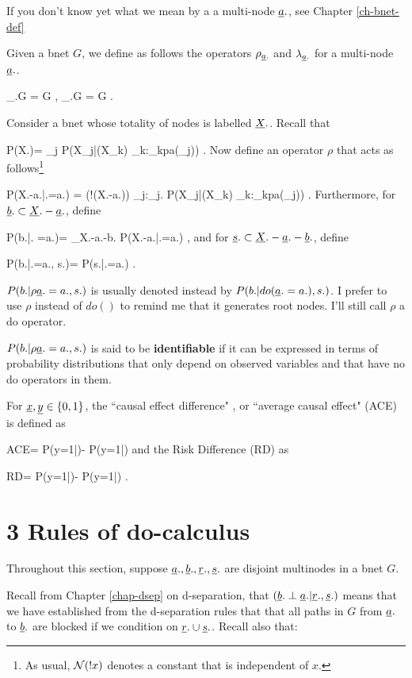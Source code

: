 If
you don't
know yet
what we mean by a
a multi-node
${\underline{a}}.$, see
Chapter \ref{ch-bnet-def}

Given a bnet
$G$,
we define
as follows
the operators
$\rho_{{\underline{a}}.}$
and
$\lambda_{{\underline{a}}.}$
for a multi-node
${\underline{a}}.$.

\beq
\rho_{\rva.}G =
G
\;,\;\;\;\;
\lam_{\rva.}G =
G
\;.
\eeq

Consider a bnet 
whose totality of nodes
is labelled ${\underline{X}}.$.
Recall that 

\beq
P(X.)=
\prod_j P(X_j|(X_k)
_{k:\rvX_k\in pa(\rvX_j)})
\;.
\eeq
Now define an
operator $\rho$
that acts as follows\footnote{As usual,
${\cal N}(!x)$ denotes 
a constant 
that is independent of $x$.}

\beq
P(X.-a.|\rho\rva.=a.)
=
\caln(!(X.-a.))
\prod_{j:\rvX_j\notin \rva.}
P(X_j|(X_k)
_{k:\rvX_k\in pa(\rvX_j)})
\;.
\eeq
Furthermore, for
${\underline{b}}.\subset {\underline{X}}.-{\underline{a}}.$,
define

\beq
P(b.|\rho\rva. =a.)=
\sum_{X.-a.-b.}
P(X.-a.|\rho\rva.=a.)
\;,
\eeq
and for
${\underline{s}}.\subset {\underline{X}}.-{\underline{a}}.-{\underline{b}}.$,
define

\beq
P(b.|\rho \rva.=a., s.)=
{P(s.|\rho\rva.=a.)}
\;.
\eeq

$P(b.|\rho {\underline{a}}.=a., s.)$
is usually denoted instead  by
$P(b.|do({\underline{a}}.=a.), s.)$.
I prefer to 
use $\rho$
instead of $do()$ to remind me that
it generates root nodes.
I'll still call $\rho$
a do operator.


$P(b.|\rho {\underline{a}}.=a., s.)$
is said to be {\bf identifiable}
if it can be
expressed in terms of
probability distributions
that only
depend on observed 
variables and that
have no do operators
in them.

For ${\underline{x}}, {\underline{y}}\in \{0,1\}$, the
``causal effect difference" ,
or ``average causal effect" (ACE)
is defined as

\beq
ACE=
P(y=1|\rho {})-
P(y=1|\rho {})
\eeq
and the 
Risk Difference (RD) as

\beq
RD=
P(y=1|)-
P(y=1|)
\;.
\eeq


\section*{3 Rules of do-calculus}
Throughout 
this section, suppose
${\underline{a}}., {\underline{b}}., {\underline{r}}., 
{\underline{s}}.$ are disjoint
multinodes in a bnet $G$.


Recall
from Chapter \ref{chap-dsep}
on d-separation,
that  $({\underline{b}}.\perp {\underline{a}}.|{\underline{r}}., {\underline{s}}.)$
means that 
we have established
from the d-separation
rules that 
that all 
paths in $G$
 from
${\underline{a}}.$ to
${\underline{b}}.$
are blocked
if we condition
on ${\underline{r}}.\cup {\underline{s}}.$.
Recall also that:

